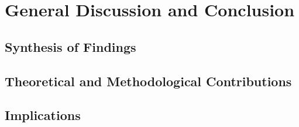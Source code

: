 \chapter{General Discussion and Conclusion}
\label{ch:conclusion}


\section{Synthesis of Findings}
\label{sec:conclusion-synthesis}


\section{Theoretical and Methodological Contributions}
\label{sec:conclusion-contributions}


\section{Implications}
\label{sec:conclusion-implications}

